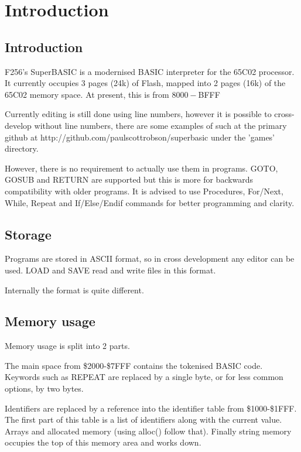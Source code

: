 \chapter{Introduction}

\section{Introduction}

F256's SuperBASIC is a modernised BASIC interpreter for the 65C02 processor. It currently occupies 3 pages (24k) of Flash, mapped into 2 pages (16k) of the 65C02 memory space. At present, this is from $8000-$BFFF

Currently editing is still done using line numbers, however it is possible to cross-develop without line numbers, there are some examples of such at the primary github at http://github.com/paulscottrobson/superbasic under the 'games' directory.

However, there is no requirement to actually use them in programs. GOTO, GOSUB and RETURN are supported but this is more for backwards compatibility with older programs. It is advised to use Procedures, For/Next, While, Repeat and If/Else/Endif commands for better programming and clarity.

\section{Storage}

Programs are stored in ASCII format, so in cross development any editor can be used. LOAD and SAVE read and write files in this format. 

Internally the format is quite different.

\section{Memory usage}

Memory usage is split into 2 parts. 

The main space from \$2000-\$7FFF contains the tokenised BASIC code. Keywords such as REPEAT are replaced by a single byte, or for less common options, by two bytes. 

Identifiers are replaced by a reference into the identifier table from \$1000-\$1FFF. The first part of this table is a list of identifiers along with the current value.
Arrays and allocated memory (using alloc() follow that).
Finally string memory occupies the top of this memory area and works down.

